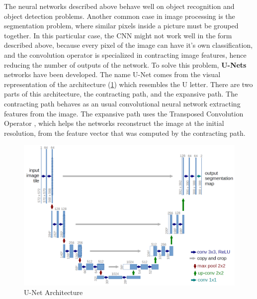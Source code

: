 The neural networks described above behave well on object recognition and object detection problems. Another common case in image processing is the segmentation problem, where similar pixels inside a picture must be grouped together. In this particular case, the CNN might not work well in the form described above, because every pixel of the image can have it's own classification, and the convolution operator is specialized in contracting image features, hence reducing the number of outputs of the network. To solve this problem, \textbf{U-Nets} networks \cite{Unet} have been developed. The name U-Net comes from the visual representation of the architecture (\ref{UnetArchitecture}) which resembles the U letter. There are two parts of this architecture, the contracting path, and the expansive path. The contracting path behaves as an usual convolutional neural network extracting features from the image. The expansive path uses the Transposed Convolution Operator \cite{ConvolutionOperatorPaper}, which helps the networks reconstruct the image at the initial resolution, from the feature vector that was computed by the contracting path. 

 \begin{figure}[H]
	\includegraphics[width=\textwidth]{Pictures/012Unet.png}
	\caption{U-Net Architecture \cite{Unet}}
	\label{UnetArchitecture}
\end{figure}